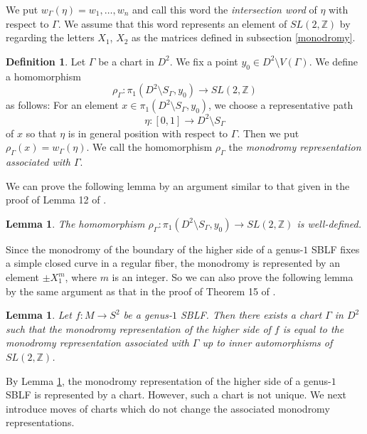 \documentclass{amsart}
\theoremstyle{plain}
\newtheorem{lem}[thm]{Lemma}
\theoremstyle{definition}
\newtheorem{defn}[thm]{Definition}
\begin{document}
\noindent
We put $w_\Gamma(\eta)=w_1,\ldots,w_n$ and call this word the {\it intersection word} of $\eta$ with respect to $\Gamma$. 
We assume that this word represents an element of $SL(2,\mathbb{Z})$ by regarding the letters $X_1$, $X_2$ as the matrices defined in subsection \ref{monodromy}. 

\begin{defn}
Let $\Gamma$ be a chart in $D^2$. 
We fix a point $y_0\in D^2\setminus V(\Gamma)$. 
We define a homomorphism
\[
\rho_\Gamma:\pi_1(D^2\setminus S_\Gamma,y_0)\rightarrow SL(2,\mathbb{Z})
\]
as follows: For an element $x\in\pi_1(D^2\setminus S_\Gamma,y_0)$, we choose a representative path
\[
\eta:[0,1]\rightarrow D^2\setminus S_\Gamma
\]
of $x$ so that $\eta$ is in general position with respect to $\Gamma$. 
Then we put $\rho_\Gamma(x)=w_\Gamma(\eta)$. 
We call the homomorphism $\rho_\Gamma$ the {\it monodromy representation associated with $\Gamma$}. 
\end{defn}

We can prove the following lemma by an argument similar to that given in the proof of Lemma 12 of \cite{KMMW}. 

\begin{lem}
The homomorphism $\rho_\Gamma:\pi_1(D^2\setminus S_\Gamma,y_0)\rightarrow SL(2,\mathbb{Z})$ is well-defined. 
\end{lem}

Since the monodromy of the boundary of the higher side of a genus-$1$ SBLF fixes a simple closed curve in a regular fiber, 
the monodromy is represented by an element $\pm X_1^m$, where $m$ is an integer. 
So we can also prove the following lemma by the same argument as that in the proof of Theorem 15 of \cite{KMMW}. 

\begin{lem}\label{relation between BLF and chart}
Let $f:M\rightarrow S^2$ be a genus-$1$ SBLF. 
Then there exists a chart $\Gamma$ in $D^2$ such that 
the monodromy representation of the higher side of $f$ is equal to the monodromy representation associated with $\Gamma$ up to inner automorphisms of $SL(2,\mathbb{Z})$. 
\end{lem}

By Lemma \ref{relation between BLF and chart}, the monodromy representation of the higher side of a genus-$1$ SBLF is represented by a chart. 
However, such a chart is not unique. 
We next introduce moves of charts which do not change the associated monodromy representations. 
\end{document}

